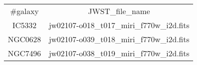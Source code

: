 \begin{table}
\begin{tabular}{cc}
#galaxy & JWST_file_name \\
IC5332 & jw02107-o018_t017_miri_f770w_i2d.fits \\
NGC0628 & jw02107-o039_t018_miri_f770w_i2d.fits \\
NGC7496 & jw02107-o038_t019_miri_f770w_i2d.fits \\
\end{tabular}
\end{table}
